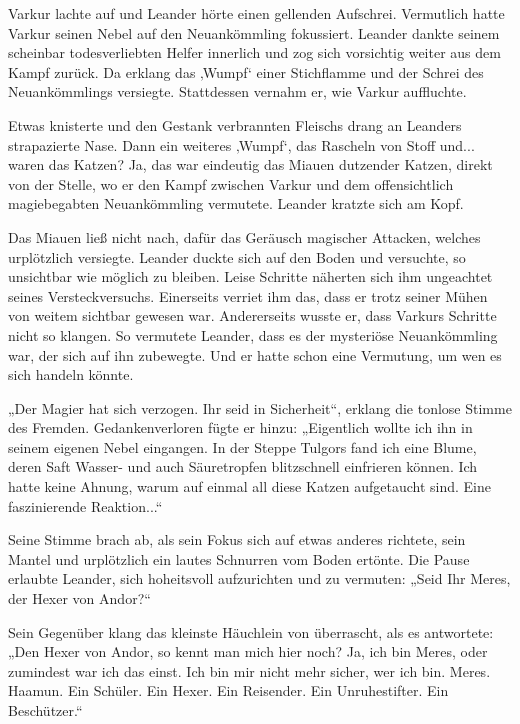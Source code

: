 \documentclass[10pt, a4paper, oneside]{book}
\begin{document}
Varkur lachte auf und Leander hörte einen gellenden Aufschrei. Vermutlich hatte Varkur seinen Nebel auf den Neuankömmling fokussiert. Leander dankte seinem scheinbar todesverliebten Helfer innerlich und zog sich vorsichtig weiter aus dem Kampf zurück. Da erklang das ‚Wumpf‘ einer Stichflamme und der Schrei des Neuankömmlings versiegte. Stattdessen vernahm er, wie Varkur auffluchte.

Etwas knisterte und den Gestank verbrannten Fleischs drang an Leanders strapazierte Nase. Dann ein weiteres ‚Wumpf‘, das Rascheln von Stoff und... waren das Katzen? Ja, das war eindeutig das Miauen dutzender Katzen, direkt von der Stelle, wo er den Kampf zwischen Varkur und dem offensichtlich magiebegabten Neuankömmling vermutete. Leander kratzte sich am Kopf.

Das Miauen ließ nicht nach, dafür das Geräusch magischer Attacken, welches urplötzlich versiegte. Leander duckte sich auf den Boden und versuchte, so unsichtbar wie möglich zu bleiben. Leise Schritte näherten sich ihm ungeachtet seines Versteckversuchs. Einerseits verriet ihm das, dass er trotz seiner Mühen von weitem sichtbar gewesen war. Andererseits wusste er, dass Varkurs Schritte nicht so klangen. So vermutete Leander, dass es der mysteriöse Neuankömmling war, der sich auf ihn zubewegte. Und er hatte schon eine Vermutung, um wen es sich handeln könnte.\bigskip







„Der Magier hat sich verzogen. Ihr seid in Sicherheit“, erklang die tonlose Stimme des Fremden. Gedankenverloren fügte er hinzu: „Eigentlich wollte ich ihn in seinem eigenen Nebel eingangen. In der Steppe Tulgors fand ich eine Blume, deren Saft Wasser- und auch Säuretropfen blitzschnell einfrieren können. Ich hatte keine Ahnung, warum auf einmal all diese Katzen aufgetaucht sind. Eine faszinierende Reaktion...“

Seine Stimme brach ab, als sein Fokus sich auf etwas anderes richtete, sein Mantel und urplötzlich ein lautes Schnurren vom Boden ertönte. Die Pause erlaubte Leander, sich hoheitsvoll aufzurichten und zu vermuten: „Seid Ihr Meres, der Hexer von Andor?“

Sein Gegenüber klang das kleinste Häuchlein von überrascht, als es antwortete: „Den Hexer von Andor, so kennt man mich hier noch? Ja, ich bin Meres, oder zumindest war ich das einst. Ich bin mir nicht mehr sicher, wer ich bin. Meres. Haamun. Ein Schüler. Ein Hexer. Ein Reisender. Ein Unruhestifter. Ein Beschützer.“
\end{document}
